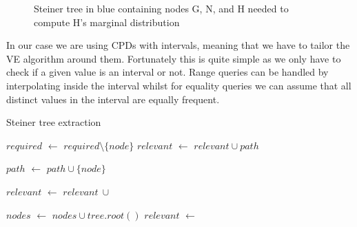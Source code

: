 \documentclass[runningheads]{llncs}
\newcommand*\Let[2]{\State #1 $\gets$ #2}
\begin{document}
\begin{figure}[H]
\centering
{}
\caption{Steiner tree in blue containing nodes G, N, and H needed to compute H's marginal distribution}
\end{figure}

In our case we are using CPDs with intervals, meaning that we have to tailor the VE algorithm around them. Fortunately this is quite simple as we only have to check if a given value is an interval or not. Range queries can be handled by interpolating inside the interval whilst for equality queries we can assume that all distinct values in the interval are equally frequent.

\begin{algorithm}[H]
  \caption{Steiner tree extraction}
  \begin{algorithmic}[1]
        \State \Return{$\{\}$}
      
        \Let{$required$}{$required \setminus \{node\}$}
        \Let{$relevant$}{$relevant \cup path$}
      \EndIf
      
      \Let{$path$}{$path \cup \{node\}$}
      
        \Let{$relevant$}{$relevant \  \cup$ }
      \EndFor
      
      \State {}
    \EndFunction
    \Statex
      \Let{$nodes$}{$nodes \cup tree.root()$}
      \Let{$relevant$}{}
      \State {}
    \EndFunction
  \end{algorithmic}
  \label{algo:steiner}
\end{algorithm}
\end{document}

